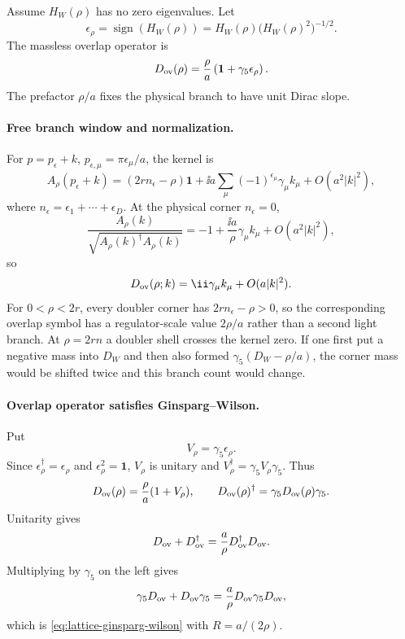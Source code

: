 Assume \(H_W(\rho)\) has no zero eigenvalues.  Let
\[
  \epsilon_\rho=\operatorname{sign}(H_W(\rho))
  =
  H_W(\rho)\bigl(H_W(\rho)^2\bigr)^{-1/2}.
\]
The massless overlap operator is
\begin{equation}
  D_{\rm ov}(\rho)
  =
  \frac{\rho}{a}
  \left(\mathbf 1+\gamma_5\epsilon_\rho\right).
  \label{eq:lattice-overlap-operator}
\end{equation}
The prefactor \(\rho/a\) fixes the physical branch to have unit Dirac slope.

\paragraph{Free branch window and normalization.}
For \(p=p_\epsilon+k\), \(p_{\epsilon,\mu}=\pi\epsilon_\mu/a\), the kernel is
\[
  A_\rho(p_\epsilon+k)
  =
  (2rn_\epsilon-\rho)\mathbf 1
  +
  \ii a\sum_\mu(-1)^{\epsilon_\mu}\gamma_\mu k_\mu
  +
  O(a^2|k|^2),
\]
where \(n_\epsilon=\epsilon_1+\cdots+\epsilon_D\).  At the physical corner
\(n_\epsilon=0\),
\[
  \frac{A_\rho(k)}{\sqrt{A_\rho(k)^\dagger A_\rho(k)}}
  =
  -1+\frac{\ii a}{\rho}\gamma_\mu k_\mu+O(a^2|k|^2),
\]
so
\[
  D_{\rm ov}(\rho;k)
  =
  \ii\gamma_\mu k_\mu+O(a|k|^2).
\]
For \(0<\rho<2r\), every doubler corner has \(2rn_\epsilon-\rho>0\), so the
corresponding overlap symbol has a regulator-scale value \(2\rho/a\) rather
than a second light branch.  At \(\rho=2rn\) a doubler shell crosses the kernel
zero.  If one first put a negative mass into \(D_W\) and then also formed
\(\gamma_5(D_W-\rho/a)\), the corner mass would be shifted twice and this
branch count would change.

\paragraph{Overlap operator satisfies Ginsparg--Wilson.}
Put
\[
  V_\rho=\gamma_5\epsilon_\rho .
\]
Since \(\epsilon_\rho^\dagger=\epsilon_\rho\) and
\(\epsilon_\rho^2=\mathbf 1\), \(V_\rho\) is unitary and
\(V_\rho^\dagger=\gamma_5V_\rho\gamma_5\).  Thus
\[
  D_{\rm ov}(\rho)=\frac{\rho}{a}(1+V_\rho),
  \qquad
  D_{\rm ov}(\rho)^\dagger
  =
  \gamma_5D_{\rm ov}(\rho)\gamma_5 .
\]
Unitarity gives
\[
  D_{\rm ov}+D_{\rm ov}^\dagger
  =
  \frac{a}{\rho}D_{\rm ov}^\dagger D_{\rm ov}.
\]
Multiplying by \(\gamma_5\) on the left gives
\[
  \gamma_5D_{\rm ov}+D_{\rm ov}\gamma_5
  =
  \frac{a}{\rho}D_{\rm ov}\gamma_5D_{\rm ov},
\]
which is \eqref{eq:lattice-ginsparg-wilson} with \(R=a/(2\rho)\).

